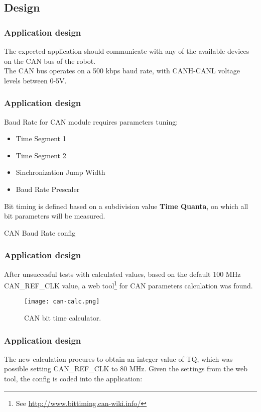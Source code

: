 
\subsection{Design}

\begin{frame}
	\frametitle{Application design}
	The expected application should communicate with any of the available devices on the CAN bus of the robot. \\
	\vfill \pause
	The CAN bus operates on a 500 kbps baud rate, with CANH-CANL voltage levels between 0-5V. %
\end{frame}

\begin{frame}[fragile]
	\frametitle{Application design}
	Baud Rate for CAN module requires parameters tuning:
	\begin{itemize}
		\item Time Segment 1
		\item Time Segment 2
		\item Sinchronization Jump Width
		\item Baud Rate Prescaler
	\end{itemize} \pause
	Bit timing is defined based on a subdivision value \textbf{Time Quanta}, on which all bit parameters will be measured. \pause
	\begin{exampleblock}{CAN Baud Rate config}
	\end{exampleblock}
\end{frame}

\begin{frame}
	\frametitle{Application design}
	After unsuccesful tests with calculated values, based on the default 100 MHz CAN\_REF\_CLK value, a web tool\footnote[frame]{See \underline{http://www.bittiming.can-wiki.info/}} for CAN parameters calculation was found.
	\vfill \pause
	\begin{figure}
		\texttt{[image: can-calc.png]}
		\caption{CAN bit time calculator.}\label{fig:can-calc}
	\end{figure}
\end{frame}

\begin{frame}
	\frametitle{Application design}
	The new calculation procures to obtain an integer value of TQ, which was possible setting CAN\_REF\_CLK to 80 MHz. Given the settings from the web tool, the config is coded into the application:
	
\end{frame}

